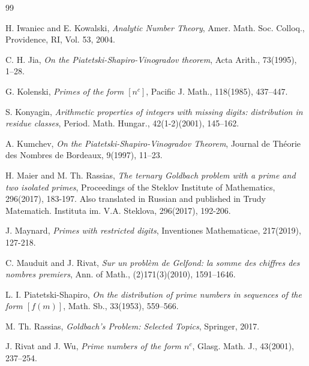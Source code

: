 \documentclass{amsart}
\numberwithin{equation}{subsection}
\begin{document}
\begin{thebibliography}{99}



\; H. Iwaniec and E. Kowalski, \textit{Analytic Number Theory}, Amer. Math. Soc. Colloq., Providence, RI, Vol. 53, 2004.


 C. H. Jia, \textit{On the Piatetski-Shapiro-Vinogradov theorem}, Acta Arith., 73(1995), 1--28.

 G. Kolenski, \textit{Primes of the form $[n^c]$}, Pacific J. Math., 118(1985), 437--447.

 S. Konyagin, \textit{Arithmetic properties of integers with missing digits: distribution in residue classes}, Period. Math. Hungar., 42(1-2)(2001), 145--162.

 A. Kumchev, \textit{On the Piatetski-Shapiro-Vinogradov Theorem}, Journal de Th\'eorie des Nombres de Bordeaux, 9(1997), 11--23.



 H. Maier and M. Th. Rassias, \textit{The ternary Goldbach problem with a prime and two isolated primes}, Proceedings of the Steklov Institute of Mathematics, 296(2017), 183-197. Also translated in Russian and published in Trudy Matematich. Instituta im. V.A. Steklova, 296(2017), 192-206.

 J. Maynard, \textit{Primes with restricted digits}, Inventiones Mathematicae, 217(2019), 127-218. 

 C. Mauduit and J. Rivat, \textit{Sur un probl\`{e}m de Gelfond: la somme des chiffres des nombres premiers}, Ann. of Math., (2)171(3)(2010), 1591--1646.

 L. I. Piatetski-Shapiro, \textit{On the distribution of prime numbers in sequences of the form $[f(m)]$}, Math. Sb., 33(1953), 559--566.

 M. Th. Rassias, \textit{Goldbach's Problem: Selected Topics}, Springer, 2017.


 J. Rivat and J. Wu, \textit{Prime numbers of the form $n^c$}, Glasg. Math. J., 43(2001), 237--254.



\end{thebibliography}
\end{document}
